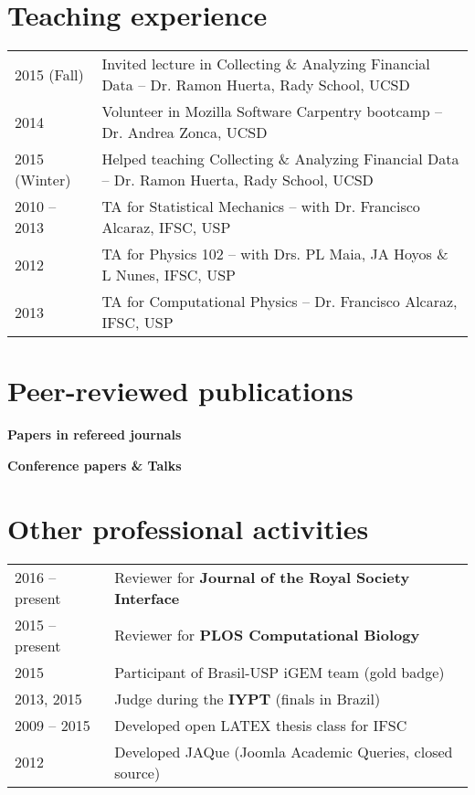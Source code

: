 \documentclass[letter,10pt]{article} %
\begin{document}
\section{Teaching experience}

\begin{longtable}{lp{15cm}}
  2015 (Fall) & Invited lecture in Collecting \& Analyzing Financial Data -- Dr. Ramon Huerta, Rady School, UCSD \\
  2014 & Volunteer in Mozilla Software Carpentry bootcamp  -- Dr. Andrea Zonca, UCSD \\
  2015 (Winter) & Helped teaching Collecting \& Analyzing Financial Data -- Dr. Ramon Huerta, Rady School, UCSD \\
  2010 -- 2013  & TA for Statistical Mechanics -- with Dr. Francisco Alcaraz, IFSC, USP \\
  2012  & TA for Physics 102 -- with Drs. PL Maia, JA Hoyos \& L Nunes, IFSC, USP \\
  2013  & TA for Computational Physics -- Dr. Francisco Alcaraz, IFSC, USP
\end{longtable}

\section{Peer-reviewed publications}

\nocite{*}

{\bf Papers in refereed journals}
\printbibliography[type=article]

{\bf Conference papers \& Talks}
\printbibliography[type=inproceedings]


\section{Other professional activities}

\begin{longtable}{ll}
  2016 -- present  & Reviewer for {\bf Journal of the Royal Society Interface} \\
  2015 -- present  & Reviewer for {\bf PLOS Computational Biology} \\
  2015 & Participant of Brasil-USP iGEM team (gold badge)\\
  2013, 2015  & Judge during the {\bf IYPT} (finals in Brazil) \\
  2009 -- 2015 & Developed open LATEX thesis class for IFSC \\
  2012 & Developed JAQue (Joomla Academic Queries, closed source)
\end{longtable}
\end{document}
